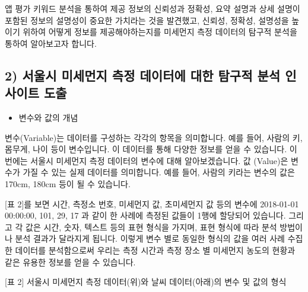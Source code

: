 \documentclass[
  letterpaper,
]{book}
\providecommand{\tightlist}{%
  \setlength{\itemsep}{0pt}\setlength{\parskip}{0pt}}\usepackage{longtable,booktabs,array}
\begin{document}
앱 평가 키워드 분석을 통하여 제공 정보의 신뢰성과 정확성, 요약 설명과
상세 설명이 포함된 정보의 설명성이 중요한 가치라는 것을 발견했고,
신뢰성, 정확성, 설명성을 높이기 위하여 어떻게 정보를 제공해야하는지를
미세먼지 측정 데이터의 탐구적 분석을 통하여 알아보고자 합니다.

\subsection{2) 서울시 미세먼지 측정 데이터에 대한 탐구적 분석 인사이트
도출}\label{uxc11cuxc6b8uxc2dc-uxbbf8uxc138uxba3cuxc9c0-uxce21uxc815-uxb370uxc774uxd130uxc5d0-uxb300uxd55c-uxd0d0uxad6cuxc801-uxbd84uxc11d-uxc778uxc0acuxc774uxd2b8-uxb3c4uxcd9c}

\begin{itemize}
\tightlist
\item
  변수와 값의 개념
\end{itemize}

변수(Variable)는 데이터를 구성하는 각각의 항목을 의미합니다. 예를 들어,
사람의 키, 몸무게, 나이 등이 변수입니다. 이 데이터를 통해 다양한 정보를
얻을 수 있습니다. 이번에는 서울시 미세먼지 측정 데이터의 변수에 대해
알아보겠습니다. 값 (Value)은 변수가 가질 수 있는 실제 데이터를
의미합니다. 예를 들어, 사람의 키라는 변수의 값은 170cm, 180cm 등이 될 수
있습니다.

{[}표 2{]}를 보면 시간, 측정소 번호, 미세먼지 값, 초미세먼지 값 등의
변수에 2018-01-01 00:00:00, 101, 29, 17 과 같이 한 사례에 측정된 값들이
1행에 할당되어 있습니다. 그리고 각 값은 시간, 숫자, 텍스트 등의 표현
형식을 가지며, 표현 형식에 따라 분석 방법이나 분석 결과가 달라지게
됩니다. 이렇게 변수 별로 동일한 형식의 값을 여러 사례 수집한 데이터를
분석함으로써 우리는 측정 시간과 측정 장소 별 미세먼지 농도의 현황과 같은
유용한 정보를 얻을 수 있습니다.

{[}표 2{]} 서울시 미세먼지 측정 데이터(위)와 날씨 데이터(아래)의 변수 및
값의 형식
\end{document}
